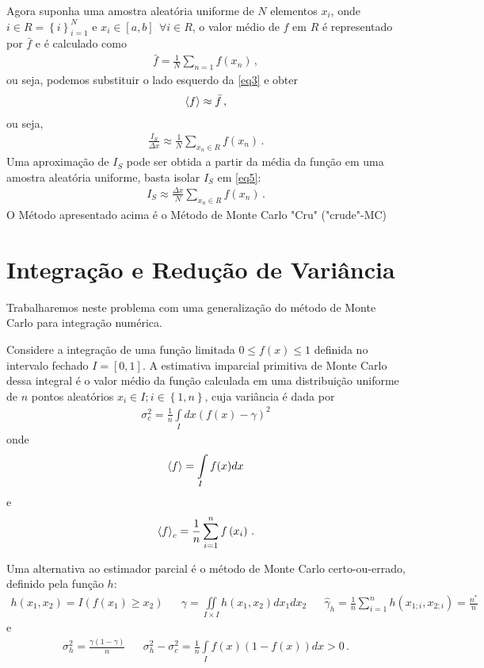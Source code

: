 \documentclass{article}
\begin{document}
Agora suponha uma amostra aleatória uniforme de $N$ elementos $x_i$, onde $i\in R=\left\{i\right\}_{i=1}^{N}$ e $x_i\in [a,b]~~\forall i\in R$, o valor médio de $f$ em $R$ é representado por $\bar{f}$ e é calculado como
\begin{align}
    \bar{f}=\frac{1}{N}\sum_{n=1}f\left(x_n\right)\,,
\end{align}
ou seja, podemos substituir o lado esquerdo da \ref{eq3} e obter
\begin{align*}
    \braket{f}\approx \bar{f}\,,
\end{align*}
ou seja,
\begin{align}\label{eq5}
    \frac{I_S}{\Delta x}\approx \frac{1}{N}\sum_{x_n\in R}f\left(x_n\right)\,.
\end{align}
Uma aproximação de $I_S$ pode ser obtida a partir da média da função em uma amostra aleatória uniforme, basta isolar $I_S$ em \ref{eq5}:
\begin{align}
    I_S\approx \frac{\Delta x}{N}\sum_{x_n\in R}f\left(x_n\right)\,.
\end{align}
O Método apresentado acima é o Método de Monte Carlo "Cru" ("crude"-MC) %





\section{Integração e Redução de Variância}

Trabalharemos neste problema com uma generalização do método de Monte Carlo para integração numérica.

Considere a integração de uma função limitada $0\leq f\left(x\right)\leq 1$ definida no intervalo fechado $I=\left[0,1\right]$. A estimativa imparcial primitiva de Monte Carlo dessa integral é o valor médio da função calculada em uma distribuição uniforme de $n$ pontos aleatórios $x_i\in I; i\in\left\{1,n\right\}$, cuja variância é dada por
\begin{align}
    \sigma_c^2=\frac{1}{n}\int\limits_{I}dx\left(f(x)-\gamma\right)^2
\end{align}
onde $$\braket{f}=\int\limits_{I}f(x)dx$$ e $$\braket{f}_c=\frac{1}{n}\sum_{i=1}^{n}f\left(x_i\right)\,.$$

Uma alternativa ao estimador parcial é o método de Monte Carlo certo-ou-errado, definido pela função $h$:
\begin{align}
    h\left(x_1,x_2\right)=I\left(f(x_1)\geq x_2\right)&&\gamma=\iint\limits_{I\times I}h\left(x_1,x_2\right)dx_1dx_2&&\hat{\gamma}_h=\frac{1}{n}\sum_{i=1}^{n}h\left(x_{1;i},x_{2;i}\right)=\frac{n^*}{n}
\end{align}
e 
\begin{align*}
    \sigma_h^2=\frac{\gamma\left(1-\gamma\right)}{n}&&\sigma_h^2-\sigma_c^2=\frac{1}{n}\int\limits_{I}f\left(x\right)\left(1-f\left(x\right)\right)dx>0\,.
\end{align*}
\end{document}
